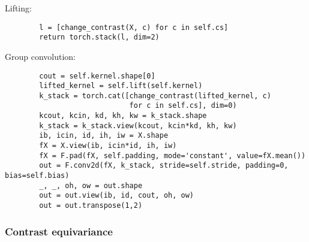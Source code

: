     Lifting:
    \begin{verbatim}
        l = [change_contrast(X, c) for c in self.cs]
        return torch.stack(l, dim=2)
    \end{verbatim}

    Group convolution:
    \begin{verbatim}
        cout = self.kernel.shape[0]
        lifted_kernel = self.lift(self.kernel)
        k_stack = torch.cat([change_contrast(lifted_kernel, c)
                             for c in self.cs], dim=0)
        kcout, kcin, kd, kh, kw = k_stack.shape
        k_stack = k_stack.view(kcout, kcin*kd, kh, kw)
        ib, icin, id, ih, iw = X.shape
        fX = X.view(ib, icin*id, ih, iw)
        fX = F.pad(fX, self.padding, mode='constant', value=fX.mean())
        out = F.conv2d(fX, k_stack, stride=self.stride, padding=0, bias=self.bias)
        _, _, oh, ow = out.shape
        out = out.view(ib, id, cout, oh, ow)
        out = out.transpose(1,2)
    \end{verbatim}

\subsubsection{Contrast equivariance}


